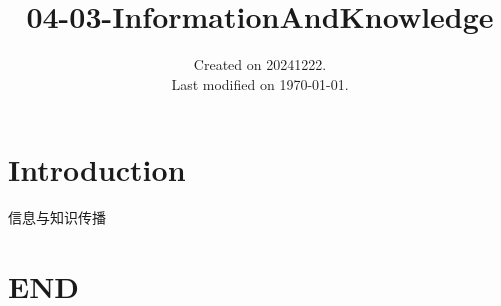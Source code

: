 \documentclass[UTF8]{../../ApplicationUniverse}
\begin{document}
\title{04-03-InformationAndKnowledge}
\date{Created on 20241222.\\   Last modified on \today.}
\maketitle
\tableofcontents


\chapter{Introduction}

信息与知识传播




\chapter{END}
\end{document}
